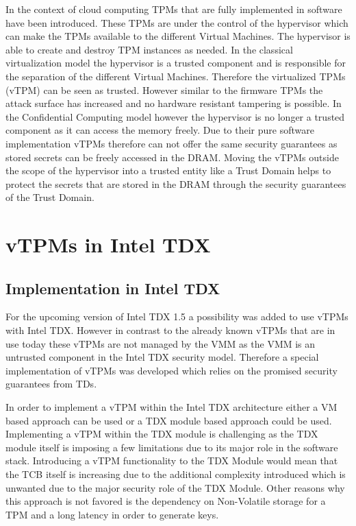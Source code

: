 \documentclass[sigplan,screen,nonacm]{acmart}
\begin{document}
In the context of cloud computing TPMs that are fully implemented in software have been introduced.
These TPMs are under the control of the hypervisor which can make the TPMs available to the different Virtual Machines.
The hypervisor is able to create and destroy TPM instances as needed.
In the classical virtualization model the hypervisor is a trusted component and is responsible for the separation of the different Virtual Machines.
Therefore the virtualized TPMs (vTPM) can be seen as trusted.
However similar to the firmware TPMs the attack surface has increased and no hardware resistant tampering is possible\cite{perez2006vtpm}\cite{vTPM-google}.
In the Confidential Computing model however the hypervisor is no longer a trusted component as it can access the memory freely.
Due to their pure software implementation vTPMs therefore can not offer the same security guarantees as stored secrets can be freely accessed in the DRAM.
Moving the vTPMs outside the scope of the hypervisor into a trusted entity like a Trust Domain helps to protect the secrets that are stored in the DRAM through the security guarantees of the Trust Domain.

\section{vTPMs in Intel TDX}
\label{chap:vTPMTDX}

\subsection{Implementation in Intel TDX}
For the upcoming version of Intel TDX 1.5 a possibility was added to use vTPMs with Intel TDX.
However in contrast to the already known vTPMs that are in use today these vTPMs are not managed by the VMM as the VMM is an untrusted component in the Intel TDX security model.
Therefore a special implementation of vTPMs was developed which relies on the promised security guarantees from TDs.

In order to implement a vTPM within the Intel TDX architecture either a VM based approach can be used or a TDX module based approach could be used.
Implementing a vTPM within the TDX module is challenging as the TDX module itself is imposing a few limitations due to its major role in the software stack.
Introducing a vTPM functionality to the TDX Module would mean that the TCB itself is increasing due to the additional complexity introduced which is unwanted due to the major security role of the TDX Module\cite[p. 4]{Intel-vTPM}.
Other reasons why this approach is not favored is the dependency on Non-Volatile storage for a TPM and a long latency in order to generate keys\cite[p. 4]{Intel-vTPM}.
\end{document}
